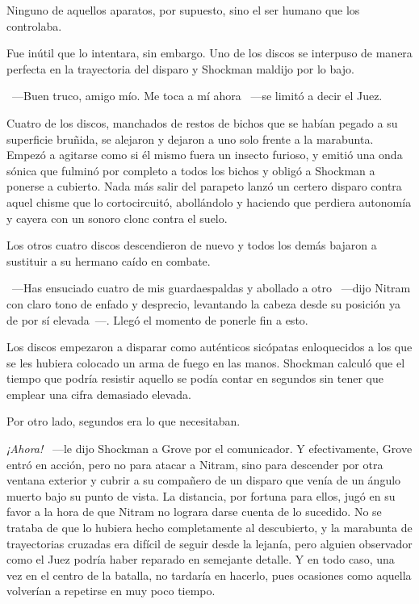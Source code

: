 Ninguno de aquellos aparatos, por supuesto, sino el ser humano que los controlaba.

Fue inútil que lo intentara, sin embargo. Uno de los discos se interpuso de manera perfecta en la trayectoria del disparo y Shockman maldijo por lo bajo.

~---Buen truco, amigo mío. Me toca a mí ahora ~---se limitó a decir el Juez.

Cuatro de los discos, manchados de restos de bichos que se habían pegado a su superficie bruñida, se alejaron y dejaron a uno solo frente a la marabunta. Empezó a agitarse como si él mismo fuera un insecto furioso, y emitió una onda sónica que fulminó por completo a todos los bichos y obligó a Shockman a ponerse a cubierto. Nada más salir del parapeto lanzó un certero disparo contra aquel chisme que lo cortocircuitó, abollándolo y haciendo que perdiera autonomía y cayera con un sonoro clonc contra el suelo.

Los otros cuatro discos descendieron de nuevo y todos los demás bajaron a sustituir a su hermano caído en combate.

~---Has ensuciado cuatro de mis guardaespaldas y abollado a otro ~---dijo Nitram con claro tono de enfado y desprecio, levantando la cabeza desde su posición ya de por sí elevada~---. Llegó el momento de ponerle fin a esto.

Los discos empezaron a disparar como auténticos sicópatas enloquecidos a los que se les hubiera colocado un arma de fuego en las manos. Shockman calculó que el tiempo que podría resistir aquello se podía contar en segundos sin tener que emplear una cifra demasiado elevada.

Por otro lado, segundos era lo que necesitaban.

\emph{¡Ahora!} ~---le dijo Shockman a Grove por el comunicador. Y efectivamente, Grove entró en acción, pero no para atacar a Nitram, sino para descender por otra ventana exterior y cubrir a su compañero de un disparo que venía de un ángulo muerto bajo su punto de vista. La distancia, por fortuna para ellos, jugó en su favor a la hora de que Nitram no lograra darse cuenta de lo sucedido. No se trataba de que lo hubiera hecho completamente al descubierto, y la marabunta de trayectorias cruzadas era difícil de seguir desde la lejanía, pero alguien observador como el Juez podría haber reparado en semejante detalle. Y en todo caso, una vez en el centro de la batalla, no tardaría en hacerlo, pues ocasiones como aquella volverían a repetirse en muy poco tiempo.

